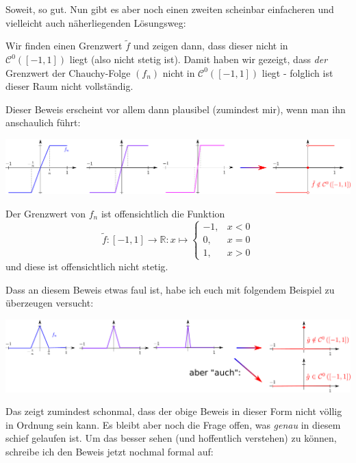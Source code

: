 \documentclass[a4paper,ngerman,12pt,bibtotoc]{scrartcl}
\theoremstyle{definition}
\theoremstyle{plain}
\theoremstyle{remark}
\newcommand{\RR}{\mathbb{R}}
\begin{document}
	\vspace{1em}
	
	Soweit, so gut. Nun gibt es aber noch einen zweiten scheinbar einfacheren und vielleicht auch näherliegenden Lösungsweg:
	
	Wir finden einen Grenzwert $\tilde{f}$ und zeigen dann, dass dieser nicht in $\mathcal{C}^0\left(\left[-1,1\right]\right)$ liegt (also nicht stetig ist). Damit haben wir gezeigt, dass \emph{der} Grenzwert der Chauchy-Folge $(f_n)$ nicht in $\mathcal{C}^0\left(\left[-1,1\right]\right)$ liegt - folglich ist dieser Raum nicht vollständig.
	
	Dieser \glqq Beweis\grqq{} erscheint vor allem dann plausibel (zumindest mir), wenn man ihn anschaulich führt:
	
	\includegraphics[width=\textwidth]{NichtvollstaendigkeitAnschaulicheKonvergenz.pdf}
	
	Der Grenzwert von $f_n$ ist \glqq offensichtlich\grqq{} die Funktion
		\[\tilde{f}: [-1,1] \to \RR: x \mapsto \begin{cases}
			-1, &x<0 \\
			0,  &x=0 \\
			1,  &x>0
		\end{cases}\]
	und diese ist offensichtlich nicht stetig.
	
	\newpage
	
	Dass an diesem \glqq Beweis\grqq{} etwas faul ist, habe ich euch mit folgendem Beispiel zu überzeugen versucht:
	
	\includegraphics[width=\textwidth]{NichtvollstaendigkeitGegenbsp.pdf}
	
	Das zeigt zumindest schonmal, dass der obige \glqq Beweis\grqq{} in dieser Form nicht völlig in Ordnung sein kann. Es bleibt aber noch die Frage offen, was \emph{genau} in diesem schief gelaufen ist. Um das besser sehen (und hoffentlich verstehen) zu können, schreibe ich den \glqq Beweis\grqq{} jetzt nochmal formal auf:
	
\end{document}
